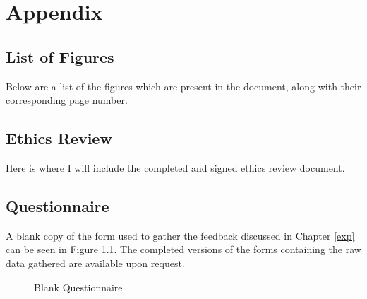 \chapter{Appendix}
\label{appendix}

\begingroup
	\section{List of Figures}
	\label{appendix:figures}
	
	Below are a list of the figures which are present in the document, along with their corresponding page number.
	
	\renewcommand{\chapter}[2]{}		%
	\listoffigures						%
\endgroup

\section{Ethics Review}
\label{appendix:ethics}
Here is where I will include the completed and signed ethics review document.

\section{Questionnaire}
A blank copy of the form used to gather the feedback discussed in Chapter \ref{exp} can be seen in Figure \ref{appendix:fig:question}. The completed versions of the forms containing the raw data gathered are available upon request.

\begin{figure}
	\label{appendix:fig:question}
	\centering	
	\caption{Blank Questionnaire}
\end{figure}